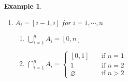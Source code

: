 \documentclass[12pt,a4paper]{article}
\newtheorem{eg}{Example}[subsection]
\newcounter{nprf}[subsection]
\newtheorem*{rmk}{\indent Remark}
\newenvironment*{prf}{\par\indent\textbf{\textit{Proof} (\stepcounter{nprf}\thenprf). }\par}{\par\hfill $\blacksquare$\par}
\def\Z{{\mathbb{Z}}}
\def\emptyset{\varnothing}
\begin{document}
\begin{eg}
\begin{enumerate}
\begin{enumerate}
			\item $\displaystyle\bigcap_{i=1}^n A_i=[0,1)$
			\begin{prf}
				Claim: $\displaystyle\bigcap_{i=1}^n A_i=[0,1).$\par($\subseteq$) Let $x\in\displaystyle\bigcap_{i=1}^n A_i.$\par\hspace{5mm}So, $x\in A_i\ \forall i\in\qty{1,2,\cdots,n}$.\par\hspace{5mm}Specifically, $x\in A_1=[0,1).\qquad\square$\par($\supseteq$) Let $x\in[0,1)$ $\quad$[WTS: $x\in A\ \forall i\in\qty{1,2,c\dots,n}$]\par\hspace{5mm}Let $k\in\qty{1,2,\cdots,n}.$ We will show $x\in A_k.$\par\hspace{5mm}We know that $k\geq1$ and $0\leq x<1,$ so we have $0\leq x<1\leq k.$\par\hspace{5mm}That is, $x\in[0,k).$\par\hspace{5mm}So, $x\in A_k$\par\hspace{5mm}Since $k\in\qty{1,2,\cdots,n}$ was \textbf{\textit{arbitrary}}, we have shown that $x\in A_k\ \forall k\in\qty{1,2,\cdots,n}.$\par\hspace{5mm}So, $x\in\displaystyle\bigcap_{i=1}^n A_i.$
			\end{prf}
		\end{enumerate}
		\begin{rmk} If $i\in\Z$, we have
		\begin{enumerate}
			\item $\displaystyle\bigcup_{i=1}^\infty A_i=[0,\infty)$
			\item $\displaystyle\bigcap_{i=1}^\infty A_i=[0,1)$
		\end{enumerate}\end{rmk}
		\item $A_i=[i-1,i]$ for $i=1,\cdots,n$
		\begin{enumerate}
			\item $\displaystyle\bigcup_{i=1}^n A_i=[0,n]$
			\item $\displaystyle\bigcap_{i=1}^n A_i=\begin{cases}[0,1]&\quad\text{if }n=1\\\qty{1}&\quad\text{if }n=2\\\emptyset&\quad\text{if }n>2\end{cases}$

\end{enumerate}
\end{enumerate}
\end{eg}
\end{document}
